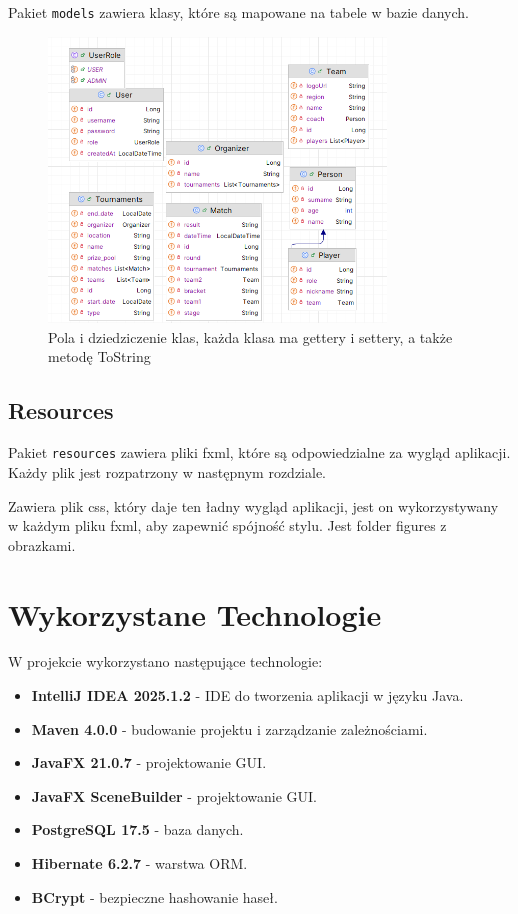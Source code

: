 Pakiet \texttt{models} zawiera klasy, które są mapowane na tabele w bazie danych.

\begin{figure}[H]
    \centering
    \caption{Pola i dziedziczenie klas, każda klasa ma gettery i settery, a także metodę ToString  \label{fig3}}
    \includegraphics[width=0.8\textwidth]{figures/Classes.png}
\end{figure}



\subsection{Resources}
Pakiet \texttt{resources} zawiera pliki fxml, które są odpowiedzialne za wygląd aplikacji. Każdy plik jest rozpatrzony w następnym rozdziale.

Zawiera plik css, który daje ten ładny wygląd aplikacji, jest on wykorzystywany w każdym pliku fxml, aby zapewnić spójność stylu. Jest folder figures z obrazkami.

\section{Wykorzystane Technologie}
W projekcie wykorzystano następujące technologie:
\begin{itemize}
    \item \textbf{IntelliJ IDEA 2025.1.2} - IDE do tworzenia aplikacji w języku Java.
    \item \textbf{Maven 4.0.0} - budowanie projektu i zarządzanie zależnościami.
    \item \textbf{JavaFX 21.0.7} - projektowanie GUI.
    \item \textbf{JavaFX SceneBuilder} - projektowanie GUI.
    \item \textbf{PostgreSQL 17.5} - baza danych.
    \item \textbf{Hibernate 6.2.7} - warstwa ORM.
    \item \textbf{BCrypt} - bezpieczne hashowanie haseł.
\end{itemize}

